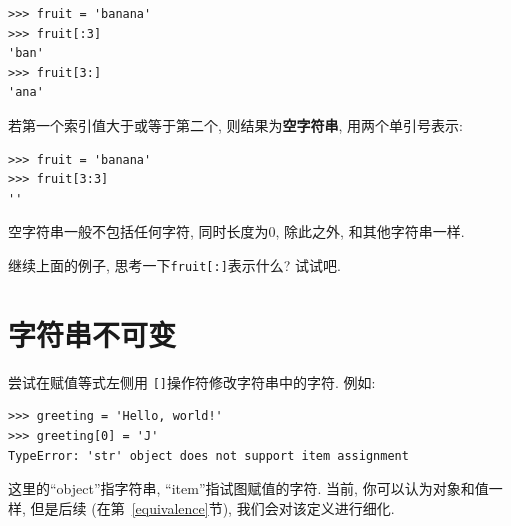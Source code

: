 \documentclass[10pt]{book}
\begin{document}
\begin{verbatim}
>>> fruit = 'banana'
>>> fruit[:3]
'ban'
>>> fruit[3:]
'ana'
\end{verbatim}
%
若第一个索引值大于或等于第二个, 则结果为{\bf 空字符串}, 用两个单引号表示:

\begin{verbatim}
>>> fruit = 'banana'
>>> fruit[3:3]
''
\end{verbatim}
%

空字符串一般不包括任何字符, 同时长度为0, 除此之外, 
和其他字符串一样. 

继续上面的例子, 思考一下{\tt fruit[:]}表示什么? 试试吧. 

\section{字符串不可变}


尝试在赋值等式左侧用 {\tt []}操作符修改字符串中的字符. 
例如:

\begin{verbatim}
>>> greeting = 'Hello, world!'
>>> greeting[0] = 'J'
TypeError: 'str' object does not support item assignment
\end{verbatim}
%
这里的``object''指字符串, ``item''指试图赋值的字符. 
当前, 你可以认为对象和值一样, 但是后续
(在第~\ref{equivalence}节), 我们会对该定义进行细化. 
\end{document}
